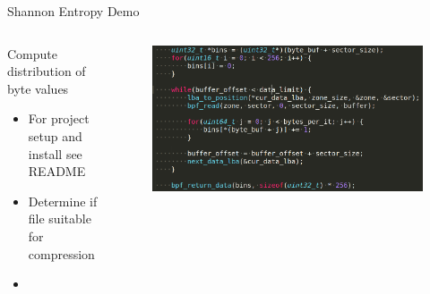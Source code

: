 \documentclass[aspectratio=169, notes]{beamer}
\begin{document}
\begin{frame}{Shannon Entropy Demo}
        \begin{columns}
            \begin{column}{0.40\textwidth}
                \footnotesize
                Compute distribution of byte values
                \begin{itemize}
                    \item For project setup and install see README
                    \item Determine if file suitable for compression
                    \item
                \end{itemize}
            \end{column}
            \begin{column}{0.60\textwidth}
                \begingroup
                \small
                \begin{figure}
                    \centering
                    \includegraphics[width=1\textwidth]{resources/images/demo-kernel.png}
                \end{figure}
                \endgroup
            \end{column}
        \end{columns}
\end{frame}
\end{document}
